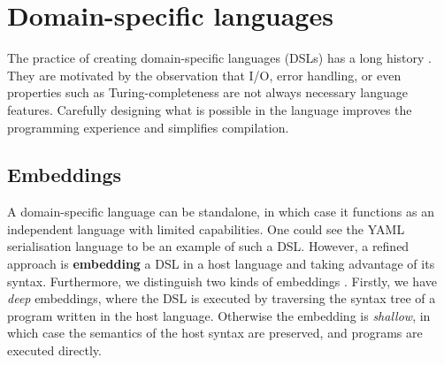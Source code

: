 




\section{Domain-specific languages}

The practice of creating domain-specific languages (DSLs) has a long history \cite{hudak1996building}. They are motivated by the observation that I/O, error handling, or even properties such as Turing-completeness are not always necessary language features. Carefully designing what is possible in the language improves the programming experience and simplifies compilation.

\subsection{Embeddings}

A domain-specific language can be standalone, in which case it functions as an independent language with limited capabilities. One could see the YAML serialisation language to be an example of such a DSL. However, a refined approach is \textbf{embedding} a DSL in a host language and taking advantage of its syntax. Furthermore, we distinguish two kinds of embeddings \cite{gibbons2014folding}. Firstly, we have \textit{deep} embeddings, where the DSL is executed by traversing the syntax tree of a program written in the host language. Otherwise the embedding is \textit{shallow}, in which case the semantics of the host syntax are preserved, and programs are executed directly.

